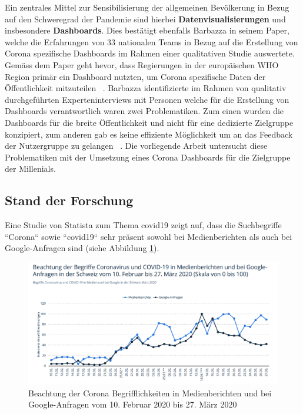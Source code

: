 Ein zentrales Mittel zur Sensibilisierung der allgemeinen Bevölkerung in Bezug auf den Schweregrad der Pandemie sind hierbei \textbf{Datenvisualisierungen} und insbesondere \textbf{Dashboards}. Dies bestätigt ebenfalls Barbazza in seinem Paper, welche die Erfahrungen von 33 nationalen Teams in Bezug auf die Erstellung von Corona spezifische Dashboards im Rahmen einer qualitativen Studie auswertete. Gemäss dem Paper geht hevor, dass Regierungen in der europäischen WHO Region primär ein Dashboard nutzten, um Corona spezifische Daten der Öffentlichkeit mitzuteilen ~\citep[S. 2]{barbazza}. Barbazza identifizierte im Rahmen von qualitativ durchgeführten Experteninterviews mit Personen welche für die Erstellung von Dashboards verantwortlich waren zwei Problematiken. Zum einen wurden die Dashboards für die breite Öffentlichkeit und nicht für eine dedizierte Zielgruppe konzipiert, zum anderen gab es keine effiziente Möglichkeit um an das Feedback der Nutzergruppe zu gelangen ~\citep[S. 14-15]{barbazza}. Die vorliegende Arbeit untersucht diese Problematiken mit der Umsetzung eines Corona Dashboards für die Zielgruppe der Millenials.


\subsection{Stand der Forschung}
 Eine Studie von Statista zum Thema \gls{covid19} zeigt auf, dass die Suchbegriffe ``Corona`` sowie  ``\gls{covid19}`` sehr präsent sowohl bei Medienberichten als auch bei Google-Anfragen sind (siehe Abbildung \ref{fig:covid_term_public_media_presence}).
 
\begin{figure}[ht]
    \includegraphics[width=12cm]{images/covid_term_public_media_presence.png}
    \centering
    \caption{Beachtung der Corona Begrifflichkeiten in Medienberichten und bei Google-Anfragen vom 10. Februar 2020 bis 27. März 2020 ~\citep[S. 50]{covid_term_public_media_presence}}
    \label{fig:covid_term_public_media_presence}
\end{figure}
 
